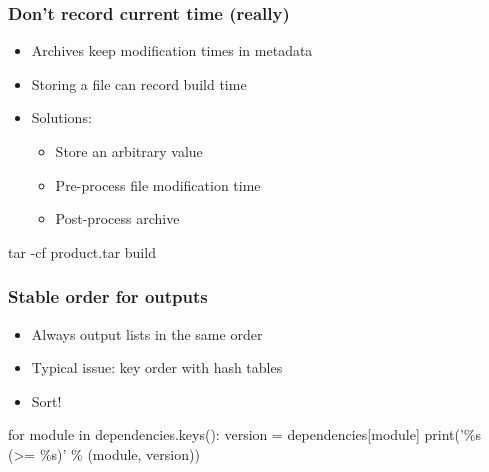 \documentclass[14pt,ignorenonframetext]{beamer}
\begin{document}
\begin{frame}[fragile]
 \frametitle{Don't record current time (really)}

 \begin{itemize}
  \item Archives keep modification times in metadata
  \item Storing a file can record build time
  \item<2-> Solutions:
   \begin{itemize}
    \item Store an arbitrary value
    \item<3-> Pre-process file modification time
    \item<4> Post-process archive
   \end{itemize}
 \end{itemize}

 \begin{example}
\begin{semiverbatim}
tar -cf product.tar build
\end{semiverbatim}
 \end{example}
\end{frame}

\begin{frame}[fragile]
 \frametitle{Stable order for outputs}

 \begin{itemize}
  \item Always output lists in the same order
  \item Typical issue: key order with hash tables
  \item<2> Sort!
 \end{itemize}

 \begin{example}
\begin{semiverbatim}
for module in dependencies.keys():
    version = dependencies[module]
    print('\%s (>= \%s)' \% (module, version))
\end{semiverbatim}
 \end{example}
\end{frame}
\end{document}
